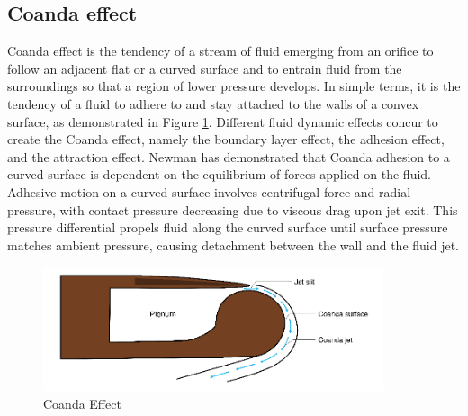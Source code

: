 \subsection{Coanda effect}
Coanda effect is the tendency of a stream of fluid emerging from an orifice to follow an adjacent flat or a curved surface and to entrain fluid from the surroundings so that a region of lower pressure develops. In simple terms, it is the tendency of a fluid to adhere to and stay attached to the walls of a convex surface, as demonstrated in Figure \ref{fig:Coanda}. Different fluid dynamic effects concur to create the Coanda effect, namely the boundary layer effect, the adhesion effect, and the attraction effect. Newman \cite{newman} has demonstrated that Coanda adhesion to a curved surface is dependent on the equilibrium of forces applied on the fluid. Adhesive motion on a curved surface involves centrifugal force and radial pressure, with contact pressure decreasing due to viscous drag upon jet exit. This pressure differential propels fluid along the curved surface until surface pressure matches ambient pressure, causing detachment between the wall and the fluid jet. 
\begin{figure}[ht]
    \centering
    \includegraphics[width=10cm]{images/Theory-CFD/Coanda-effect.png}
    \caption{Coanda Effect}
    \label{fig:Coanda}
  \end{figure}
